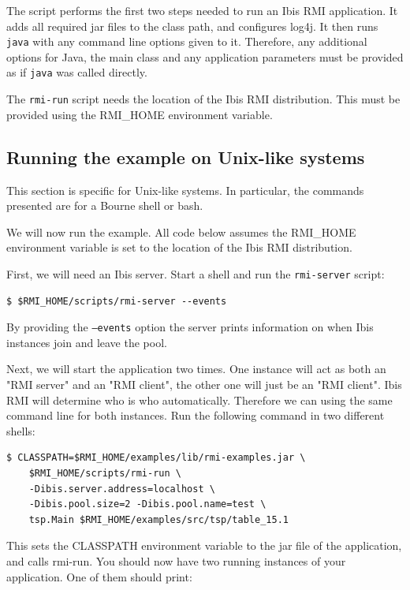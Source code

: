 \documentclass[a4paper,10pt]{article}
\begin{document}
The script performs the first two steps needed to run an Ibis RMI application.
It adds all required jar files
to the class path, and configures log4j.
It then runs \texttt{java} with any
command line options given to it. Therefore, any additional options for
Java, the main class and any application parameters must be provided as
if \texttt{java} was called directly.

The \texttt{rmi-run} script needs the location of the Ibis RMI
distribution. This must be provided using the RMI\_HOME environment
variable.

\subsection{Running the example on Unix-like systems}

This section is specific for Unix-like systems. In particular, the
commands presented are for a Bourne shell or bash.

We will now run the example. All code below assumes the RMI\_HOME
environment variable is set to the location of the Ibis RMI distribution.

First, we will need an Ibis server. Start a shell and
run the \texttt{rmi-server} script:
\noindent
{\small
\begin{verbatim}
$ $RMI_HOME/scripts/rmi-server --events
\end{verbatim}
}
\noindent

By providing the \texttt{--events} option the server
prints information on when Ibis instances join and leave the pool.

Next, we will start the application two times. One instance will act as both
an "RMI server" and an "RMI client", the other one will just be an "RMI client".
Ibis RMI will determine who is who automatically. Therefore we can using the
same command line for both instances.
Run the following command in two different shells:

\noindent
{\small
\begin{verbatim}
$ CLASSPATH=$RMI_HOME/examples/lib/rmi-examples.jar \
    $RMI_HOME/scripts/rmi-run \
    -Dibis.server.address=localhost \
    -Dibis.pool.size=2 -Dibis.pool.name=test \
    tsp.Main $RMI_HOME/examples/src/tsp/table_15.1
\end{verbatim}
}
\noindent

This sets the CLASSPATH environment variable to the jar file of the
application, and calls rmi-run. You should now have two running
instances of your application. One of them should print:
\end{document}
